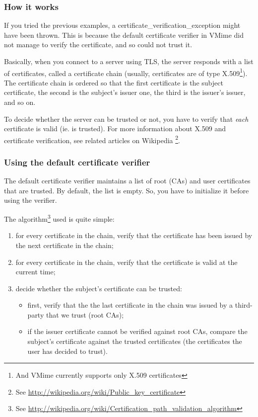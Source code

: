 \subsubsection{How it works} %

If you tried the previous examples, a
{\vcode certificate\_verification\_exception} might have been thrown.
This is because the default certificate verifier in VMime did not manage to
verify the certificate, and so could not trust it.

Basically, when you connect to a server using TLS, the server responds with
a list of certificates, called a certificate chain (usually, certificates are
of type X.509\footnote{And VMime currently supports only X.509 certificates}).
The certificate chain is ordered so that the first certificate is the subject
certificate, the second is the subject's issuer one, the third is the issuer's
issuer, and so on.

To decide whether the server can be trusted or not, you have to verify that
\emph{each} certificate is valid (ie. is trusted). For more information
about X.509 and certificate verification, see related articles on Wikipedia
\footnote{See \url{http://wikipedia.org/wiki/Public\_key\_certificate}}.

\subsubsection{Using the default certificate verifier} %

The default certificate verifier maintains a list of root (CAs) and user
certificates that are trusted. By default, the list is empty. So, you have
to initialize it before using the verifier.

The algorithm\footnote{See
\url{http://wikipedia.org/wiki/Certification\_path\_validation\_algorithm}}
used is quite simple:

\begin{enumerate}
\item for every certificate in the chain, verify that the certificate has been
issued by the next certificate in the chain;
\item for every certificate in the chain, verify that the certificate is valid
at the current time;
\item decide whether the subject's certificate can be trusted:
	\begin{itemize}
	\item first, verify that the the last certificate in the chain was
	issued by a third-party that we trust (root CAs);
	\item if the issuer certificate cannot be verified against root CAs,
	compare the subject's certificate against the trusted certificates
	(the certificates the user has decided to trust).
	\end{itemize}
\end{enumerate}

